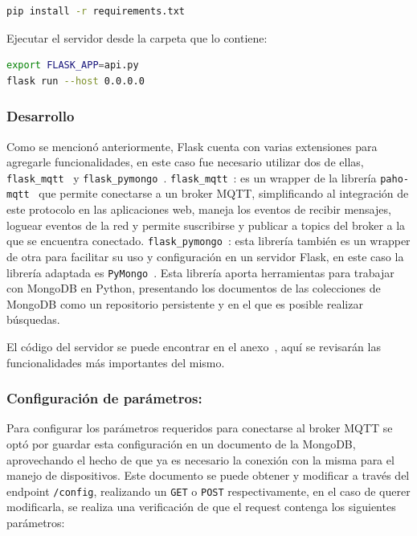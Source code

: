 \begin{lstlisting}[language=bash]
pip install -r requirements.txt
\end{lstlisting}

Ejecutar el servidor desde la carpeta que lo contiene:

\begin{lstlisting}[language=bash]
export FLASK_APP=api.py
flask run --host 0.0.0.0
\end{lstlisting}

\subsubsection{Desarrollo}
Como se mencionó anteriormente, Flask cuenta con varias extensiones para agregarle funcionalidades, en este caso fue necesario utilizar dos de ellas, \lstinline[columns=fixed]{flask_mqtt}~\cite{flask-mqtt} y \lstinline[columns=fixed]{flask_pymongo}~\cite{}.
\lstinline[columns=fixed]{flask_mqtt}~\cite{flask-mqtt}: es un wrapper de la librería \lstinline[columns=fixed]{paho-mqtt}~\cite{paho-mqtt} que permite conectarse a un broker MQTT, simplificando al integración de este protocolo en las aplicaciones web, maneja los eventos de recibir mensajes, loguear eventos de la red y permite suscribirse y publicar a topics del broker a la que se encuentra conectado. 
\lstinline[columns=fixed]{flask_pymongo}~\cite{flask-pymongo}: esta librería también es un wrapper de otra para facilitar su uso y configuración en un servidor Flask, en este caso la librería adaptada es \lstinline[columns=fixed]{PyMongo}~\cite{PyMongo}. Esta librería aporta herramientas para trabajar con MongoDB en Python, presentando los documentos de las colecciones de MongoDB como un repositorio persistente y en el que es posible realizar búsquedas.

El código del servidor se puede encontrar en el anexo~, aquí se revisarán las funcionalidades más importantes del mismo.

\subsubsection{Configuración de parámetros:}
Para configurar los parámetros requeridos para conectarse al broker MQTT se optó por guardar esta configuración en un documento de la MongoDB, aprovechando el hecho de que ya es necesario la conexión con la misma para el manejo de dispositivos.
Este documento se puede obtener y modificar a través del endpoint \lstinline[columns=fixed]{/config}, realizando un \lstinline[columns=fixed]{GET} o \lstinline[columns=fixed]{POST} respectivamente, en el caso de querer modificarla, se realiza una verificación de que el request contenga los siguientes parámetros:


